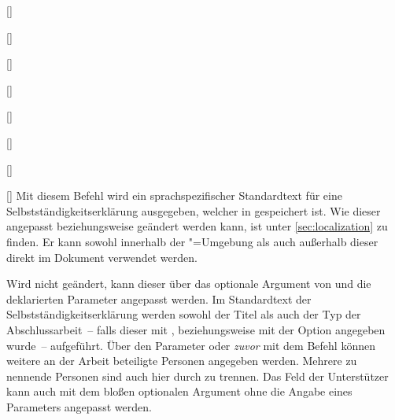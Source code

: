 \begin{Declaration}{}
\begin{Declaration}{[]}
\begin{Declaration}{[]}
\begin{Declaration}{[]}
\begin{Declaration}{[]}
\begin{Declaration}[v2.02]{%
  []%
}
\begin{Declaration}[v2.02]{%
  []%
}
\begin{Declaration}[v2.02]{%
  []%
}
\begin{Declaration}{[\PSet]}
\printdeclarationlist%
%
%
Mit diesem Befehl wird ein sprachspezifischer Standardtext für eine 
Selbstständigkeitserklärung ausgegeben, welcher in  
gespeichert ist. Wie dieser angepasst beziehungsweise geändert werden kann, ist 
unter \autoref{sec:localization} zu finden. Er kann sowohl innerhalb der 
"=Umgebung als auch außerhalb dieser direkt im 
Dokument verwendet werden. 

Wird  nicht geändert, kann dieser über das optionale 
Argument von  und die deklarierten Parameter angepasst 
werden. Im Standardtext der Selbstständigkeitserklärung werden sowohl der Titel 
als auch der Typ der Abschlussarbeit~-- falls dieser mit , 
 beziehungsweise mit der Option 
 angegeben wurde~-- aufgeführt. Über den Parameter 
 oder \emph{zuvor} mit dem Befehl 
 können weitere an der Arbeit beteiligte Personen angegeben 
werden. Mehrere zu nennende Personen sind auch hier durch  zu 
trennen. Das Feld der Unterstützer kann auch mit dem bloßen optionalen Argument 
ohne die Angabe eines Parameters angepasst werden.


\end{Declaration}
\end{Declaration}
\end{Declaration}
\end{Declaration}
\end{Declaration}
\end{Declaration}
\end{Declaration}
\end{Declaration}
\end{Declaration}
